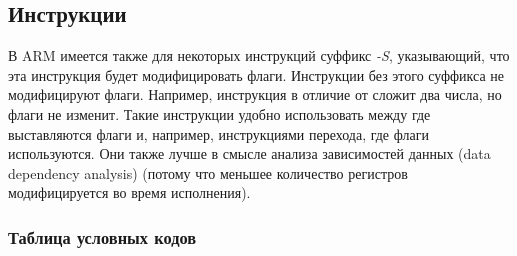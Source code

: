 \subsection{Инструкции}

В ARM имеется также для некоторых инструкций суффикс \emph{-S}, указывающий, 
что эта инструкция будет модифицировать флаги.
Инструкции без этого суффикса не модифицируют флаги.
Например, инструкция  в отличие от 
сложит два числа, но флаги не изменит.
Такие инструкции удобно использовать
между \CMP где выставляются флаги и, например, инструкциями перехода, где флаги используются.
Они также лучше в смысле анализа зависимостей данных (data dependency analysis) 
(потому что меньшее количество регистров модифицируется во время исполнения).



\subsubsection{Таблица условных кодов}

